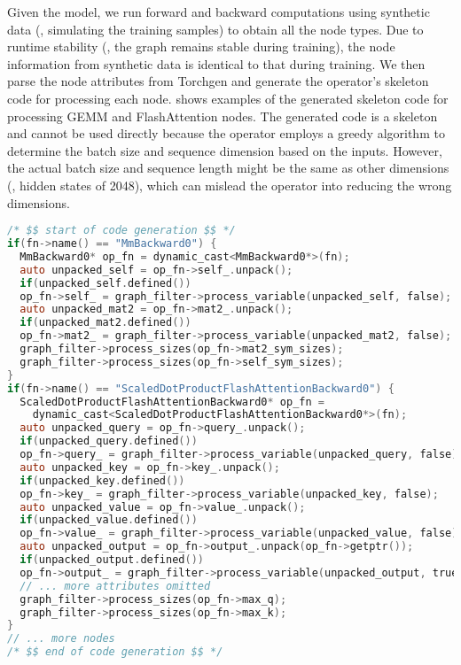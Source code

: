 Given the model, we run forward and backward computations using synthetic data (\ie, simulating the training samples) to obtain all the node types. Due to runtime stability (\ie, the graph remains stable during training), the node information from synthetic data is identical to that during training. We then parse the node attributes from Torchgen and generate the operator's skeleton code for processing each node.  shows examples of the generated skeleton code for processing GEMM and FlashAttention nodes.
The generated code is a skeleton and cannot be used directly because the operator employs a greedy algorithm to determine the batch size and sequence dimension based on the inputs. However, the actual batch size and sequence length might be the same as other dimensions (\eg, hidden states of 2048), which can mislead the operator into reducing the wrong dimensions.


\vspace{+2mm}
\begin{lstlisting}[language=C, caption={Generated skeleton code for processing GEMM and FlashAttention nodes. The automatic code generation enables \solution to support various nodes with low implementation costs (\eg, PyTorch has more than 300 types of nodes).}, label={code:offline}]
/* $$ start of code generation $$ */
if(fn->name() == "MmBackward0") {
  MmBackward0* op_fn = dynamic_cast<MmBackward0*>(fn); 
  auto unpacked_self = op_fn->self_.unpack();
  if(unpacked_self.defined()) 
  op_fn->self_ = graph_filter->process_variable(unpacked_self, false);
  auto unpacked_mat2 = op_fn->mat2_.unpack();
  if(unpacked_mat2.defined()) 
  op_fn->mat2_ = graph_filter->process_variable(unpacked_mat2, false); 
  graph_filter->process_sizes(op_fn->mat2_sym_sizes);
  graph_filter->process_sizes(op_fn->self_sym_sizes);
}
if(fn->name() == "ScaledDotProductFlashAttentionBackward0") {
  ScaledDotProductFlashAttentionBackward0* op_fn = 
    dynamic_cast<ScaledDotProductFlashAttentionBackward0*>(fn); 
  auto unpacked_query = op_fn->query_.unpack();
  if(unpacked_query.defined()) 
  op_fn->query_ = graph_filter->process_variable(unpacked_query, false);
  auto unpacked_key = op_fn->key_.unpack();
  if(unpacked_key.defined()) 
  op_fn->key_ = graph_filter->process_variable(unpacked_key, false);
  auto unpacked_value = op_fn->value_.unpack();
  if(unpacked_value.defined()) 
  op_fn->value_ = graph_filter->process_variable(unpacked_value, false);
  auto unpacked_output = op_fn->output_.unpack(op_fn->getptr());
  if(unpacked_output.defined()) 
  op_fn->output_ = graph_filter->process_variable(unpacked_output, true);
  // ... more attributes omitted
  graph_filter->process_sizes(op_fn->max_q);
  graph_filter->process_sizes(op_fn->max_k);
}
// ... more nodes
/* $$ end of code generation $$ */
\end{lstlisting}

